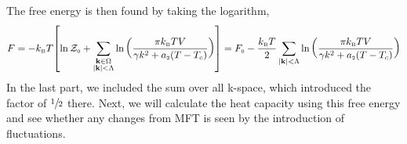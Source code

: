 The free energy is then found by taking the logarithm, 
$$F = -k_{\text{\tiny B}} T \qty[\ln \mathcal Z_{\text{\tiny 0}} +\sum\limits_{\substack{\vb{k}\in \Omega\\ \abs{\vb{k}}<\Lambda}}\ln \qty(\frac{\pi k_{\text{\tiny B}} T V}{\gamma k^2+a_{\text{\tiny 2}}(T-T_c)})  ] = F_{\text{\tiny 0}} -\frac{k_{\text{\tiny B}} T}{2}\sum\limits_{\abs{\vb{k}}<\Lambda}\ln \qty(\frac{\pi k_{\text{\tiny B}} T V}{\gamma k^2+a_{\text{\tiny 2}}(T-T_c)})$$
In the last part, we included the sum over all k-space, which introduced the factor of $\sfrac{1}{2}$ there. Next, we will calculate the heat capacity using this free energy and see whether any changes from MFT is seen by the introduction of fluctuations. 